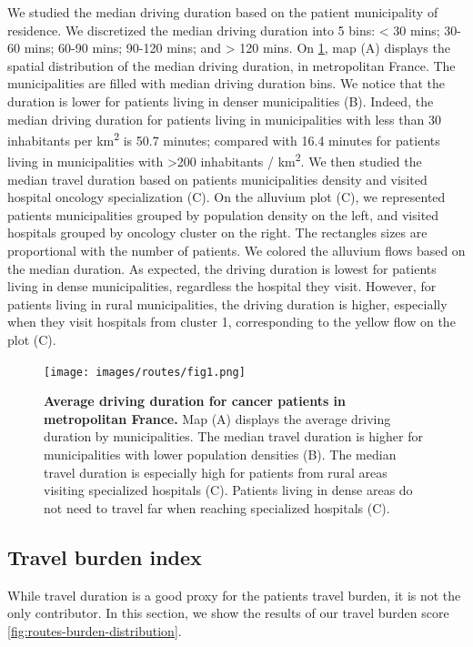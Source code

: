 We studied the median driving duration based on the patient municipality of
residence. We discretized the median driving duration into 5 bins: < 30 mins;
30-60 mins; 60-90 mins; 90-120 mins; and > 120 mins. On
\cref{fig:routes-duration-france}, map (A) displays the spatial distribution
of the median driving duration, in metropolitan France. The municipalities
are filled with median driving duration bins. We notice that the duration is
lower for patients living in denser municipalities (B). Indeed, the median
driving duration for patients living in municipalities with less than 30
inhabitants per km\textsuperscript{2} is 50.7 minutes; compared with
16.4 minutes for patients living in municipalities with
>200 inhabitants / km\textsuperscript{2}. We then studied the median travel
duration based on patients municipalities density and visited hospital oncology
specialization (C). On the alluvium plot (C), we represented patients
municipalities grouped by population density on the left, and visited hospitals
grouped by oncology cluster on the right. The rectangles sizes are proportional
with the number of patients. We colored the alluvium flows based on the median
duration. As expected, the driving duration is lowest for patients living in
dense municipalities, regardless the hospital they visit. However, for patients
living in rural municipalities, the driving duration is higher, especially when
they visit hospitals from cluster 1, corresponding to the yellow flow on the
plot (C).

\begin{figure}[h!]
    \texttt{[image: images/routes/fig1.png]}
    \centering
    \caption{ \textbf{Average driving duration for cancer patients in
            metropolitan France.} Map (A) displays the average driving duration by
        municipalities. The median travel duration is higher for municipalities
        with lower population densities (B). The median travel duration is
        especially high for patients from rural areas visiting specialized
        hospitals (C). Patients living in dense areas do not need to travel far
        when reaching specialized hospitals (C). }
    \label{fig:routes-duration-france}
\end{figure}

\subsection{Travel burden index}

While travel duration is a good proxy for the patients travel burden, it is not
the only contributor. In this section, we show the results of our travel burden
score \cref{fig:routes-burden-distribution}.

